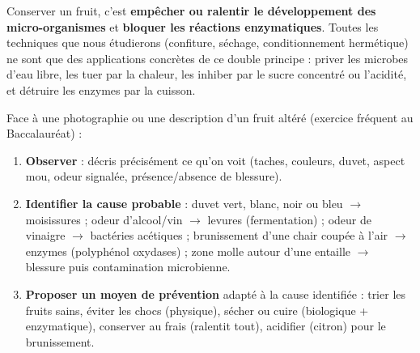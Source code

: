 \documentclass[11pt]{article}
\newcommand{\cle}[1]{{\popxbold\color{popdark}#1}}
\begin{document}
\begin{aretenir}
\cle{Conserver} un fruit, c'est \textbf{empêcher ou ralentir le développement des micro-organismes} et \textbf{bloquer les réactions enzymatiques}. Toutes les techniques que nous étudierons (confiture, séchage, conditionnement hermétique) ne sont que des applications concrètes de ce double principe : priver les microbes d'eau libre, les tuer par la chaleur, les inhiber par le sucre concentré ou l'acidité, et détruire les enzymes par la cuisson.
\end{aretenir}

\begin{methode}
Face à une photographie ou une description d'un fruit altéré (exercice fréquent au Baccalauréat) :
\begin{enumerate}
\item \textbf{Observer} : décris précisément ce qu'on voit (taches, couleurs, duvet, aspect mou, odeur signalée, présence/absence de blessure).
\item \textbf{Identifier la cause probable} : duvet vert, blanc, noir ou bleu $\rightarrow$ moisissures ; odeur d'alcool/vin $\rightarrow$ levures (fermentation) ; odeur de vinaigre $\rightarrow$ bactéries acétiques ; brunissement d'une chair coupée à l'air $\rightarrow$ enzymes (polyphénol oxydases) ; zone molle autour d'une entaille $\rightarrow$ blessure puis contamination microbienne.
\item \textbf{Proposer un moyen de prévention} adapté à la cause identifiée : trier les fruits sains, éviter les chocs (physique), sécher ou cuire (biologique + enzymatique), conserver au frais (ralentit tout), acidifier (citron) pour le brunissement.
\end{enumerate}
\end{methode}
\end{document}
